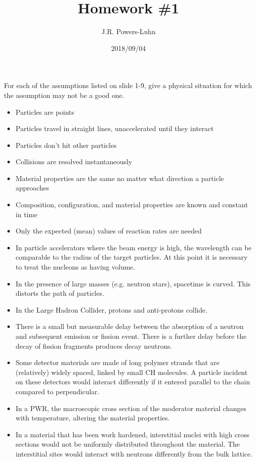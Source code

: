 \documentclass{hw}
\author{J.R. Powers-Luhn}
\date{2018/09/04}
\title{Homework \#1}
\begin{document}

\problem{}
    For each of the assumptions listed on slide 1-9, give a physical situation for which the assumption may not be a good one.
    \begin{itemize}
        \item Particles are points
        \item Particles travel in straight lines, unaccelerated until they interact
        \item Particles don't hit other particles
        \item Collisions are resolved instantaneously
        \item Material properties are the same no matter what direction a particle approaches
        \item Composition, configuration, and material properties are known and constant in time
        \item Only the expected (mean) values of reaction rates are needed
    \end{itemize}

\solution
    \begin{itemize}
        \item In particle accelerators where the beam energy is high, the wavelength can be comparable to the radius of the target particles. At this point it is necessary to treat the nucleons as having volume.
        \item In the presence of large masses (e.g. neutron stars), spacetime is curved. This distorts the path of particles.
        \item In the Large Hadron Collider, protons and anti-protons collide.
        \item There is a small but measurable delay between the absorption of a neutron and subsequent emission or fission event. There is a further delay before the decay of fission fragments produces decay neutrons.
        \item Some detector materials are made of long polymer strands that are (relatively) widely spaced, linked by small CH molecules. A particle incident on these detectors would interact differently if it entered parallel to the chain compared to perpendicular.
        \item In a PWR, the macroscopic cross section of the moderator material changes with temperature, altering the material properties.
        \item In a material that has been work hardened, interstitial nuclei with high cross sections would not be uniformly distributed throughout the material. The interstitial sites would interact with neutrons differently from the bulk lattice.
    \end{itemize}
\end{document}
